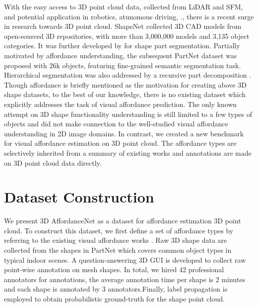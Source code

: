 \documentclass[final]{cvpr}
\begin{document}
With the easy access to 3D point cloud data, \eg collected from LiDAR and SFM, and potential application in robotics, atunomous driving, \etc., there is a recent surge in research towards 3D point cloud. ShapeNet \cite{chang2015shapenet} collected
3D CAD models from open-sourced 3D repositories,
with more than 3,000,000 models and 3,135 object categories. It was further developed by \cite{yi2016scalable} for shape part segmentation. Partially motivated by affordance understanding, the subsequent PartNet dataset \cite{mo2019partnet} was proposed with 26k objects, featuring fine-grained semantic segmentation task. Hierarchical segmentation was also addressed by a recursive part decomposition \cite{yu2019partnet}. Though affordance is briefly mentioned as the motivation for creating above 3D shape datasets, to the best of our knowledge, there is no existing dataset which explicitly addresses the task of visual affordance prediction. The only known attempt on 3D shape functionality understanding \cite{hu2016learning} is still limited to a few types of objects and did not make connection to the well-studied visual affordance understanding in 2D image domains. In contrast, we created a new benchmark for visual affordance estimation on 3D point cloud. The affordance types are selectively inherited from a summary of existing works and annotations are made on 3D point cloud data directly.








\section{Dataset Construction}









We present 3D AffordanceNet as a dataset for affordance estimation 3D point cloud. To construct this dataset, we first define a set of affordance types by referring to the existing visual affordance works \cite{hassanin2018visual}. Raw 3D shape data are collected from the shapes in PartNet \cite{mo2019partnet} which covers common object types in typical indoor scenes. A question-answering 3D GUI is developed to collect raw point-wise annotation on mesh shapes. In total, we hired 42 professional annotators for annotations, the average annotation time per shape is 2 minutes and each shape is annotated by 3 annotators.Finally, label propagation is employed to obtain probabilistic ground-truth for the shape point cloud.
\end{document}
